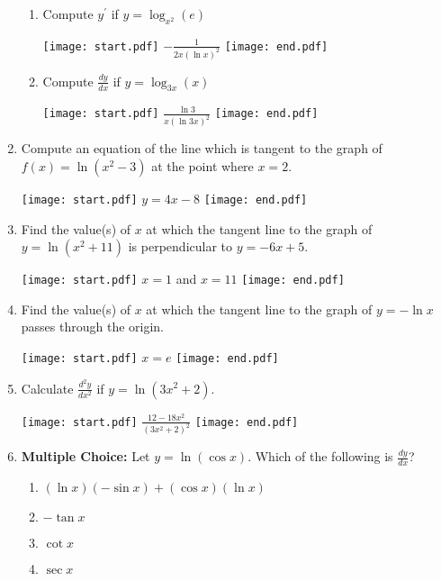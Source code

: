 \documentclass[12pt]{article}
\begin{document}
\begin{enumerate}
\begin{enumerate}
\item Compute $y^{\prime}$ if  $y=\log_{x^2}{(e)}$

\texttt{[image: start.pdf]}
{{$-\frac{1}{2x(\ln{x})^2}$}}
\texttt{[image: end.pdf]}


\item Compute $\frac{dy}{dx}$ if $y = \log_{3x}{(x)}$ 

\texttt{[image: start.pdf]}
{{$\frac{\ln{3}}{x(\ln{3x})^2}$}}
\texttt{[image: end.pdf]}


\end{enumerate}

\item Compute an equation of the line which is tangent to the graph of $f(x)=\ln{(x^2-3)}$ at the point where $x=2$.

\texttt{[image: start.pdf]}
{{$y=4x-8$}}
\texttt{[image: end.pdf]}


\item Find the value(s) of $x$ at which the tangent line to the graph of $y=\ln{(x^2+11)}$  is perpendicular to $y=-6x+5$.

\texttt{[image: start.pdf]}
{{$x=1$ and $x=11$}}
\texttt{[image: end.pdf]}


\item Find the value(s) of $x$ at which the tangent line to the graph of $y=-\ln{x}$ passes through the origin.

\texttt{[image: start.pdf]}
{{$x=e$}}
\texttt{[image: end.pdf]}


\item Calculate $\frac{d^2y}{dx^2}$ if $y=\ln{(3x^2+2)}$.

\texttt{[image: start.pdf]}
{{$\frac{12-18x^2}{(3x^2+2)^2}$}}
\texttt{[image: end.pdf]}


\newpage

\item {\bf Multiple Choice:} Let $y=\ln{(\cos{x})}$.  Which of the following is $\frac{dy}{dx}$?

\begin{enumerate}

\item $(\ln{x})(-\sin{x})+(\cos{x})(\ln{x})$

\item $-\tan{x}$

\item $\cot{x}$

\item $\sec{x}$


\end{enumerate}
\end{enumerate}
\end{document}

